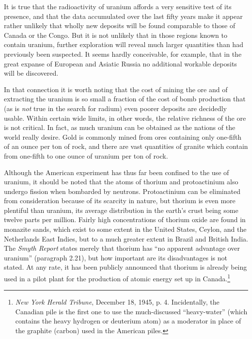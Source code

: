 It is true that the radioactivity of uranium affords a very sensitive test of its presence, and that the data accumulated over the last fifty years make it appear rather unlikely that wholly new deposits will be found comparable to those of Canada or the Congo. But it is not unlikely that in those regions known to contain uranium, further exploration will reveal much larger quantities than had previously been suspected. It seems hardly conceivable, for example, that in the great expanse of European and Asiatic Russia no additional workable deposits will be discovered.

In that connection it is worth noting that the cost of mining the ore and of extracting the uranium is so small a fraction of the cost of bomb production that (as is \emph{not} true in the search for radium) even poorer deposits are decidedly usable. Within certain wide limits, in other words, the relative richness of the ore is not critical. In fact, as much uranium can be obtained as the nations of the world really desire. Gold is commonly mined from ores containing only one-fifth of an ounce per ton of rock, and there are vast quantities of granite which contain from one-fifth to one ounce of uranium per ton of rock.

Although the American experiment has thus far been confined to the use of uranium, it should be noted that the atoms of thorium and protoactinium also undergo fission when bombarded by neutrons. Protoactinium can be eliminated from consideration because of its scarcity in nature, but thorium is even more plentiful than uranium, its average distribution in the earth's crust being some twelve parts per million. Fairly high concentrations of thorium oxide are found in monazite sands, which exist to some extent in the United States, Ceylon, and the Netherlands East Indies, but to a much greater extent in Brazil and British India. The \emph{Smyth Report} states merely that thorium has ``no apparent advantage over uranium'' (paragraph 2.21), but how important are its disadvantages is not stated. At any rate, it has been publicly announced that thorium is already being used in a pilot plant for the production of atomic energy set up in Canada.\footnote{\textit{New York Herald Tribune}, December 18, 1945, p. 4. Incidentally, the Canadian pile is the first one to use the much-discussed ``heavy-water'' (which contains the heavy hydrogen or deuterium atom) as a moderator in place of the graphite (carbon) used in the American piles.}

